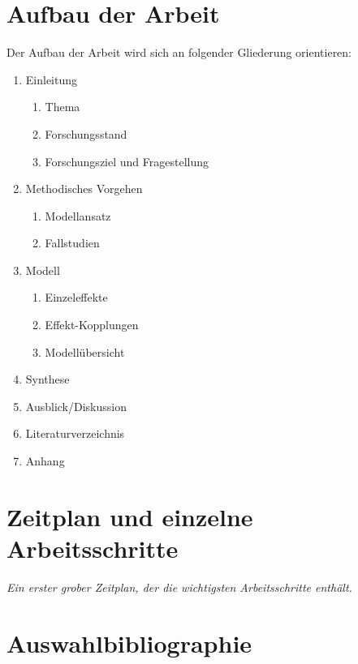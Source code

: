 \documentclass[11pt, titlepage=true]{scrartcl} %
\newcommand{\was}[1]{\small\textit{#1}}
\begin{document}
\newpage
\section{Aufbau der Arbeit}
Der Aufbau der Arbeit wird sich an folgender Gliederung orientieren:

\begin{enumerate}
\item Einleitung
	\begin{enumerate}
		\item Thema
		\item Forschungsstand
		\item Forschungsziel und Fragestellung
	\end{enumerate}
\item Methodisches Vorgehen
	\begin{enumerate}
		\item Modellansatz
		\item Fallstudien
	\end{enumerate}
\item Modell
	\begin{enumerate}
		\item Einzeleffekte
		\item Effekt-Kopplungen
		\item Modellübersicht
	\end{enumerate}

\item Synthese
\item Ausblick/Diskussion
\item Literaturverzeichnis
\item Anhang
\end{enumerate}

\section{Zeitplan und einzelne Arbeitsschritte}
\was{Ein erster grober Zeitplan, der die wichtigsten Arbeitsschritte enthält.}

\section{Auswahlbibliographie}
\cite{tukker_eight_2004}
\printbibliography
\end{document}
